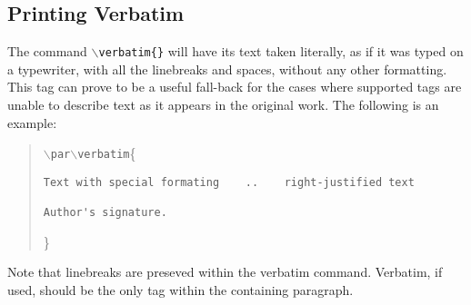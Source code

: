 \documentclass[11pt]{article}
\newcommand{\cmd}[1]{{\tt $\backslash$#1}}
\begin{document}
\subsection{Printing Verbatim}

The command \cmd{verbatim\{\}} will have its text taken literally, as
if it was typed on a typewriter, with all the linebreaks and spaces,
without any other formatting. This tag can prove to be a useful
fall-back for the cases where supported tags are unable to describe
text as it appears in the original work. The following is an example:

\begin{quote}
  \cmd{par}\cmd{verbatim}\{
\begin{verbatim}
Text with special formating    ..    right-justified text

Author's signature.
\end{verbatim}
\}
\end{quote}

\noindent Note that linebreaks are preseved within the verbatim
command. Verbatim, if used, should be the only tag within the
containing paragraph.
\end{document}
